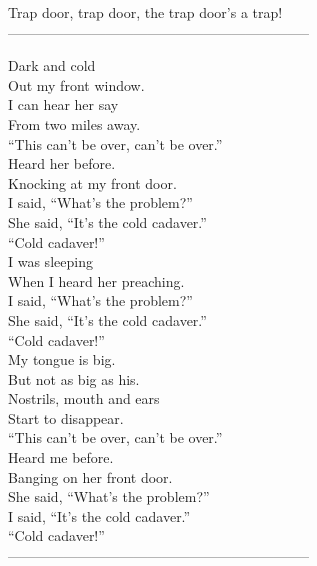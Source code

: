 Trap door, trap door, the trap door's a trap! \\

-----------------------------------------------------------------



Dark and cold \\
Out my front window. \\
I can hear her say \\
From two miles away. \\

``This can't be over, can't be over.'' \\

Heard her before. \\
Knocking at my front door. \\
I said, ``What's the problem?'' \\
She said, ``It's the cold cadaver.'' \\

``Cold cadaver!'' \\

I was sleeping \\
When I heard her preaching. \\
I said, ``What's the problem?'' \\
She said, ``It's the cold cadaver.'' \\

``Cold cadaver!'' \\

My tongue is big. \\
But not as big as his. \\
Nostrils, mouth and ears \\
Start to disappear. \\

``This can't be over, can't be over.'' \\
Heard me before. \\
Banging on her front door. \\
She said, ``What's the problem?'' \\
I said, ``It's the cold cadaver.'' \\

``Cold cadaver!'' \\

-----------------------------------------------------------------


